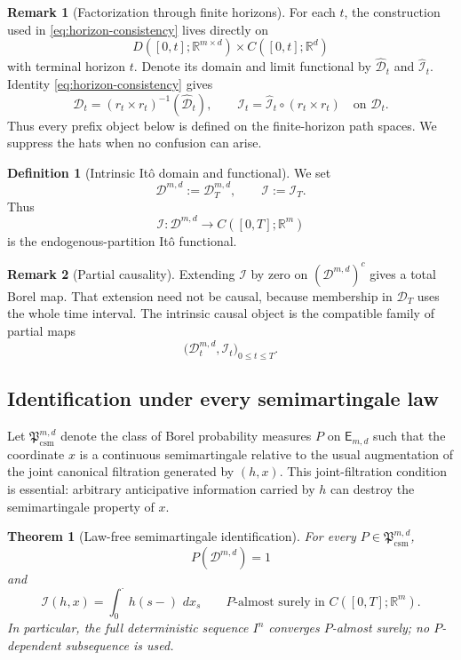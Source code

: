\documentclass[11pt,reqno]{amsart}
\theoremstyle{plain}
\newtheorem{theorem}{Theorem}[section]
\theoremstyle{definition}
\newtheorem{definition}[definition]{Definition}
\newtheorem{remark}[remark]{Remark}
\newcommand{\R}{\mathbb R}
\newcommand{\cD}{\mathcal D}
\newcommand{\cI}{\mathcal I}
\newcommand{\dd}{\,d}
\begin{document}
\begin{remark}[Factorization through finite horizons]
\label{rem:horizon-factorization}
For each \(t\), the construction used in
\eqref{eq:horizon-consistency} lives directly on
\[
  D([0,t];\R^{m\times d})\times C([0,t];\R^d)
\]
with terminal horizon \(t\).  Denote its domain and limit functional by
\(\widehat{\cD}_t\) and \(\widehat{\cI}_t\).  Identity
\eqref{eq:horizon-consistency} gives
\[
  \cD_t=(r_t\times r_t)^{-1}(\widehat{\cD}_t),
  \qquad
  \cI_t=\widehat{\cI}_t\circ(r_t\times r_t)
  \quad\text{on }\cD_t .
\]
Thus every prefix object below is defined on the finite-horizon
path spaces.  We suppress the hats when no confusion can arise.
\end{remark}

\begin{definition}[Intrinsic It\^o domain and functional]
\label{def:intrinsic-integral}
We set
\[
  \cD^{m,d}:=\cD_T^{m,d},
  \qquad
  \cI:=\cI_T.
\]
Thus
\[
  \cI:\cD^{m,d}\longrightarrow C([0,T];\R^m)
\]
is the endogenous-partition It\^o functional.
\end{definition}

\begin{remark}[Partial causality]
\label{rem:partial-causal}
Extending \(\cI\) by zero on \((\cD^{m,d})^c\) gives a total Borel map.
That extension need not be causal, because membership in \(\cD_T\) uses the
whole time interval.  The intrinsic causal object is the compatible family of
partial maps
\[
  \bigl(\cD_t^{m,d},\cI_t\bigr)_{0\le t\le T}.
\]
\end{remark}

\subsection{Identification under every semimartingale law}

Let \(\mathfrak P_{\mathrm{csm}}^{m,d}\) denote the class of Borel probability
measures \(P\) on \(\mathsf E_{m,d}\) such that the coordinate \(x\) is a
continuous semimartingale relative to the usual augmentation of the joint
canonical filtration generated by \((h,x)\).  This joint-filtration
condition is essential: arbitrary anticipative information carried by \(h\)
can destroy the semimartingale property of \(x\).

\begin{theorem}[Law-free semimartingale identification]
\label{thm:semimartingale-identification}
For every \(P\in\mathfrak P_{\mathrm{csm}}^{m,d}\),
\begin{equation}\label{eq:D-full}
  P(\cD^{m,d})=1
\end{equation}
and
\begin{equation}\label{eq:I-identification}
  \cI(h,x)
  =
  \int_0^\cdot h(s-)\,\dd x_s
  \qquad
  P\text{-almost surely in }C([0,T];\R^m).
\end{equation}
In particular, the full deterministic sequence \(I^n\) converges
\(P\)-almost surely; no \(P\)-dependent subsequence is used.
\end{theorem}
\end{document}

